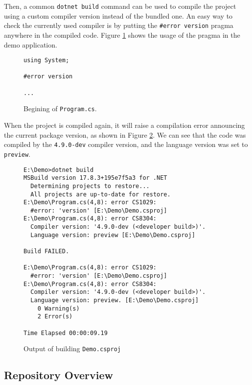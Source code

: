 \par
Then, a common \texttt{dotnet build} command can be used to compile the project using a custom compiler version instead of the bundled one. 
An easy way to check the currently used compiler is by putting the \texttt{\#error version} pragma anywhere in the compiled code. 
Figure \ref{img66:pragma} shows the usage of the pragma in the demo application.
\begin{figure}[h]
\begin{lstlisting}
using System;

#error version

...
\end{lstlisting}
\caption{Begining of \texttt{Program.cs}.}
\label{img66:pragma}
\end{figure}
\par
When the project is compiled again, it will raise a compilation error announcing the current package version, as shown in Figure \ref{img67:output}. 
We can see that the code was compiled by the \texttt{4.9.0-dev} compiler version, and the language version was set to \texttt{preview}.
\begin{figure}[h]
\begin{lstlisting}
E:\Demo>dotnet build
MSBuild version 17.8.3+195e7f5a3 for .NET
  Determining projects to restore...
  All projects are up-to-date for restore.
E:\Demo\Program.cs(4,8): error CS1029: 
  #error: 'version' [E:\Demo\Demo.csproj]
E:\Demo\Program.cs(4,8): error CS8304: 
  Compiler version: '4.9.0-dev (<developer build>)'. 
  Language version: preview [E:\Demo\Demo.csproj]

Build FAILED.

E:\Demo\Program.cs(4,8): error CS1029: 
  #error: 'version' [E:\Demo\Demo.csproj]
E:\Demo\Program.cs(4,8): error CS8304: 
  Compiler version: '4.9.0-dev (<developer build>)'. 
  Language version: preview. [E:\Demo\Demo.csproj]
    0 Warning(s)
    2 Error(s)

Time Elapsed 00:00:09.19
\end{lstlisting}
\caption{Output of building \texttt{Demo.csproj}}
\label{img67:output}
\end{figure}

\subsection{Repository Overview}

